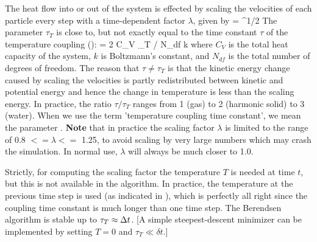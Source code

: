 The heat flow into or out of the system is effected by scaling the
velocities of each particle every step with a time-dependent factor
$\lambda$, given by
\beq 
\lambda = ^{1/2}
\label{eqn:lambda}
\eeq
The parameter $\tau_T$ is close to, but not exactly equal to the time constant
$\tau$ of the temperature coupling ():
\beq
\tau = 2 C_V \tau_T / N_{df} k
\eeq
where $C_V$ is the total heat capacity of the system, $k$ is Boltzmann's
constant, and $N_{df}$ is the total number of degrees of freedom. The
reason that $\tau \neq \tau_T$ is that the kinetic energy change
caused by scaling the velocities is partly redistributed between
kinetic and potential energy and hence the change in temperature is
less than the scaling energy.  In practice, the ratio $\tau / \tau_T$
ranges from 1 (gas) to 2 (harmonic solid) to 3 (water). When we use
the term 'temperature coupling time constant', we mean the parameter
.  
{\bf Note} that in practice the scaling factor $\lambda$ is limited to 
the range of 0.8 $<= \lambda <=$ 1.25, to avoid scaling by very large
numbers which may crash the simulation. In normal use, 
$\lambda$ will always be much closer to 1.0.
  
Strictly, for computing the scaling factor the temperature $T$ is
needed at time $t$, but this is not available in the algorithm. In
practice, the temperature at the previous time step is used (as
indicated in ), which is perfectly all right since the
coupling time constant is much longer than one time step. The
Berendsen algorithm is stable up to $\tau_T \approx {\Delta t}$.  [A simple
steepest-descent minimizer can be implemented by setting $T=0$ and
$\tau_T \ll \delta t$.]


